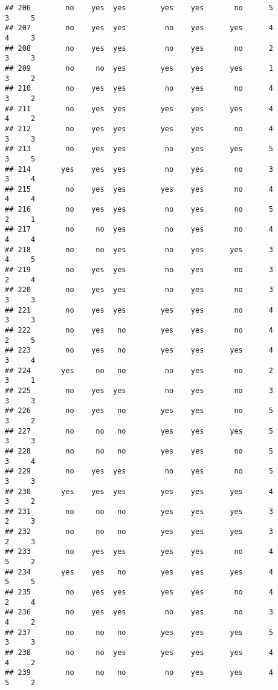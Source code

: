 \documentclass[]{article}
\begin{document}
\begin{verbatim}
## 206        no    yes  yes        yes    yes       no      5        3     5
## 207        no    yes  yes         no    yes      yes      4        4     3
## 208        no    yes  yes         no    yes       no      2        3     3
## 209        no     no  yes        yes    yes      yes      1        3     2
## 210        no    yes  yes         no    yes       no      4        3     2
## 211        no    yes  yes        yes    yes      yes      4        4     2
## 212        no    yes  yes        yes    yes       no      4        3     3
## 213        no    yes  yes         no    yes      yes      5        3     5
## 214       yes    yes  yes         no    yes       no      3        3     4
## 215        no    yes  yes        yes    yes       no      4        4     4
## 216        no    yes  yes         no    yes       no      5        2     1
## 217        no     no  yes         no    yes       no      4        4     4
## 218        no     no  yes         no    yes      yes      3        4     5
## 219        no    yes  yes         no    yes       no      3        2     4
## 220        no    yes  yes         no    yes       no      3        3     3
## 221        no    yes  yes        yes    yes       no      4        3     3
## 222        no    yes   no        yes    yes       no      4        2     5
## 223        no    yes   no        yes    yes      yes      4        3     4
## 224       yes     no   no         no    yes       no      2        3     1
## 225        no    yes  yes         no    yes       no      3        3     3
## 226        no    yes   no        yes    yes       no      5        3     2
## 227        no     no   no        yes    yes      yes      5        3     3
## 228        no     no   no        yes    yes       no      5        3     4
## 229        no    yes  yes         no    yes       no      5        3     3
## 230       yes    yes  yes        yes    yes      yes      4        3     2
## 231        no     no   no        yes    yes      yes      3        2     3
## 232        no     no   no        yes    yes      yes      3        2     3
## 233        no    yes  yes        yes    yes       no      4        5     2
## 234       yes    yes   no        yes    yes      yes      4        5     5
## 235        no    yes  yes        yes    yes       no      4        2     4
## 236        no    yes  yes         no    yes       no      3        4     2
## 237        no     no   no        yes    yes      yes      5        3     3
## 238        no     no  yes        yes    yes      yes      4        4     2
## 239        no     no   no         no    yes      yes      4        5     2

\end{verbatim}
\end{document}
